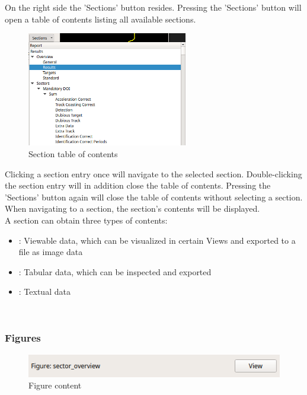 On the right side the 'Sections' button resides. Pressing the 'Sections' button will open a table of 
contents listing all available sections.

\begin{figure}[H]
    \hspace*{-2.5cm}
    \center
    \includegraphics[width=7cm,frame]{figures/section_button.png}
  \caption{Section table of contents}
\end{figure}

Clicking a section entry once will navigate to the selected section. Double-clicking the section entry will 
in addition close the table of contents. Pressing the 'Sections' button again will close the table of contents
without selecting a section. \\

When navigating to a section, the section's contents will be displayed. \\

A section can obtain three types of contents:

\begin{itemize}  
    \item {}: Viewable data, which can be visualized in certain Views and exported to a file as image data
    \item {}: Tabular data, which can be inspected and exported
    \item {}: Textual data
\end{itemize}
\ \\

\subsubsection{Figures} 
\label{sec:report_section_figures}

\begin{figure}[H]
    \hspace*{-2.5cm}
    \center
    \includegraphics[width=12cm,frame]{figures/content_figure.png}
  \caption{Figure content}
\end{figure}

